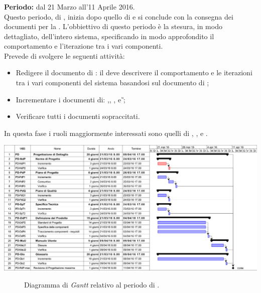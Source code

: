 \subsubsection{\PD}
\textbf{Periodo:} dal 21 Marzo all'11 Aprile 2016. \\
Questo periodo, di \PD, inizia dopo quello di \PA e si conclude con la consegna dei documenti per la \RP. L'obbiettivo di questo periodo è la stesura, in modo dettagliato, dell'intero sistema, specificando in modo approfondito il comportamento e l'iterazione tra i vari componenti. \\
Prevede di svolgere le seguenti attività:
\begin{itemize}
	\item Redigere il documento di \textit{\DDP}: il \textit{\Prog} deve descrivere il comportamento e le iterazioni tra i vari componenti del sistema basandosi sul documento di \textit{\ST};  
	\item Incrementare i documenti di: \textit{\NdP},\textit{\PdP}, \textit{\PdQ}, \textit{\ST} e \textit{\G};
	\item Verificare tutti i documenti sopraccitati.
\end{itemize}
In questa fase i ruoli maggiormente interessati sono quelli di \textit{\Amm}, \textit{\Res}, \textit{\Prog} e \textit{\Ver}. 
\begin{center}
	\includegraphics[keepaspectratio = true, width=16cm]{immagini/PdP_ProgettazioneDiDettaglioGantt.png}
\end{center}
\begin{figure}[h]
	\caption{Diagramma di \textit{Gantt} relativo al periodo di \PD.}\label{etichetta}
\end{figure}

